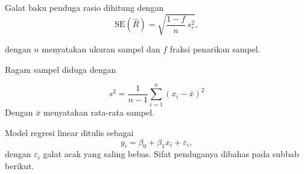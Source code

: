 \documentclass{article}
\begin{document}
Galat baku penduga rasio dihitung dengan
\begin{equation}
\mathrm{SE}(\hat R)=\sqrt{\frac{1-f}{n}\,s_r^2},
\end{equation}

dengan $n$ menyatakan ukuran sampel dan $f$ fraksi penarikan sampel.

Ragam sampel diduga dengan

\[ s^2=\frac{1}{n-1}\sum_{i=1}^{n}(x_i-\bar x)^2 \]
Dengan $\bar x$ menyatakan rata-rata sampel.

Model regresi linear ditulis sebagai
\begin{equation}
y_i=\beta_0+\beta_1x_i+\varepsilon_i,
\end{equation}
dengan $\varepsilon_i$ galat acak yang saling bebas.
Sifat penduganya dibahas pada subbab berikut.
\end{document}
